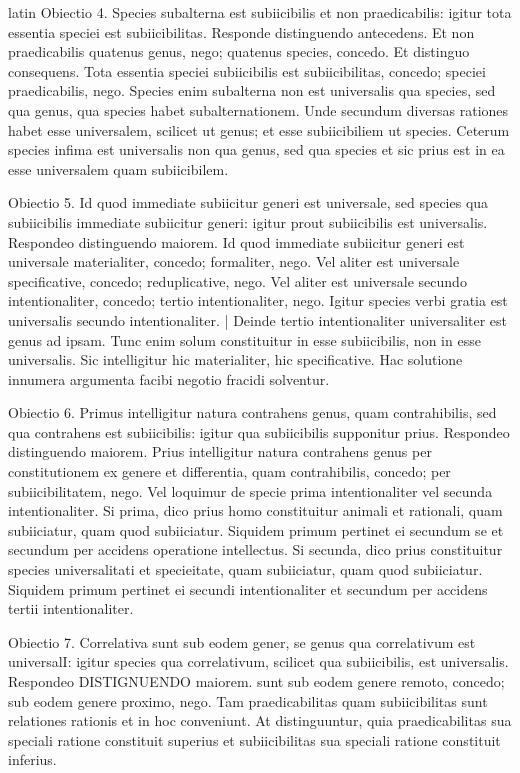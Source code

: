 \begin{otherlanguage*}{latin}
\pstart
 Obiectio 4. Species subalterna est subiicibilis et non praedicabilis: igitur tota essentia speciei est subiicibilitas. Responde distinguendo antecedens. Et non praedicabilis quatenus genus, nego; quatenus species, concedo. Et distinguo consequens. Tota essentia speciei subiicibilis est subiicibilitas, concedo; speciei praedicabilis, nego. Species enim subalterna non est universalis qua species, sed qua genus, qua species habet subalternationem. Unde secundum diversas rationes habet esse universalem, scilicet ut genus; et esse subiicibiliem ut species. Ceterum species infima est universalis non qua genus, sed qua species et sic prius est in ea esse universalem quam subiicibilem. 
\pend

\pstart
 Obiectio 5. Id quod immediate subiicitur  generi est universale, sed species qua subiicibilis immediate subiicitur generi: igitur prout subiicibilis est universalis. Respondeo distinguendo maiorem. Id quod immediate subiicitur generi est universale materialiter, concedo; formaliter, nego. Vel aliter est universale specificative, concedo; reduplicative, nego. Vel aliter est universale secundo intentionaliter, concedo; tertio intentionaliter, nego. Igitur species verbi gratia est universalis secundo intentionaliter. \textnormal{|} Deinde tertio intentionaliter  universaliter est genus ad ipsam. Tunc enim solum constituitur in esse subiicibilis, non in esse  universalis. Sic intelligitur hic materialiter, hic specificative. Hac solutione innumera argumenta facibi negotio fracidi solventur. 
\pend

\pstart
 Obiectio 6. Primus intelligitur natura contrahens genus, quam contrahibilis, sed qua contrahens est subiicibilis: igitur qua subiicibilis supponitur prius. Respondeo distinguendo maiorem. Prius intelligitur natura contrahens genus per constitutionem ex genere et differentia, quam contrahibilis, concedo; per subiicibilitatem, nego. Vel loquimur de specie prima intentionaliter vel secunda intentionaliter. Si prima, dico prius homo constituitur animali et rationali, quam subiiciatur, quam quod subiiciatur. Siquidem primum pertinet ei secundum se et secundum per accidens operatione intellectus. Si secunda, dico prius constituitur species universalitati et specieitate, quam subiiciatur, quam quod subiiciatur. Siquidem primum pertinet ei secundi intentionaliter et secundum per accidens tertii intentionaliter. 
\pend

\pstart
 Obiectio 7. Correlativa sunt sub eodem gener, se genus qua correlativum est universalI: igitur species qua correlativum, scilicet qua subiicibilis, est universalis. Respondeo DISTIGNUENDO maiorem. sunt sub eodem genere remoto, concedo; sub eodem genere proximo, nego. Tam praedicabilitas quam subiicibilitas sunt relationes rationis et in hoc conveniunt. At distinguuntur, quia praedicabilitas sua speciali ratione constituit superius et subiicibilitas sua speciali ratione constituit inferius. 
\pend


\end{otherlanguage*}
